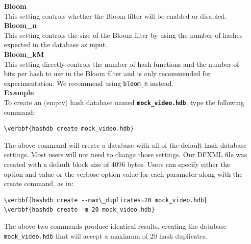 \documentclass[11pt,fleqn]{article} %
\begin{document}
\textbf{Bloom}\\
This setting controls whether the Bloom filter will be enabled or disabled. \\

\textbf{Bloom\_n}\\
This setting controls the size of the Bloom filter by using the number of hashes expected in the database as input. \\

\textbf{Bloom\_kM}\\
This setting directly controls the number of hash functions and the number of bits per hash to use in the Bloom filter and is only recommended for experimentation.  We recommend using \verb+bloom_n+ instead.\\

\textbf{Example}\\
To create an (empty) hash database named \textbf{\texttt{mock\_video.hdb}}, type the following command:
\begin{Verbatim}[commandchars=\\\{\}]
\verbbf{hashdb create mock_video.hdb}
\end{Verbatim}
The above command will create a database with all of the default hash database settings. Most users will not need to change those settings. Our DFXML file was created with a default block size of 4096 bytes.
Users can specify either the option and value or the verbose option value for each parameter along with the create command, as in:\\
\begin{Verbatim}[commandchars=\\\{\}]
\verbbf{hashdb create --max\_duplicates=20 mock_video.hdb}
\verbbf{hashdb create -m 20 mock_video.hdb}
\end{Verbatim}
The above two commands produce identical results, creating the database \texttt{mock\_video.hdb} that will accept a maximum of 20 hash duplicates.\\
\end{document}
